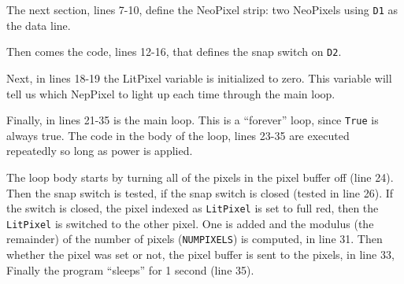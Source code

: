 \documentclass[letterpaper,twoside,12pt]{article}
\begin{document}
The next section, lines 7-10, define the NeoPixel strip: two NeoPixels using 
\texttt{D1} as the data line.

Then comes the code, lines 12-16, that defines the snap switch on \texttt{D2}.

Next, in lines 18-19 the LitPixel variable is initialized to zero. This
variable will tell us which NepPixel to light up each time through the main
loop.

Finally, in lines 21-35 is the main loop. This is a ``forever'' loop, since
\texttt{True} is always true. The code in the body of the loop, lines 23-35
are executed repeatedly so long as power is applied.

The loop body starts by turning all of the pixels in the pixel buffer off
(line 24). Then the snap switch is tested, if the snap switch is closed
(tested in line 26). If the switch is closed, the pixel indexed as
\texttt{LitPixel} is set to full red, then the \texttt{LitPixel} is switched
to the other pixel. One is added and the modulus (the remainder) of the number
of pixels (\texttt{NUMPIXELS}) is computed, in line 31. Then whether the
pixel was set or not, the pixel buffer is sent to the pixels, in line 33, 
Finally the program ``sleeps'' for 1 second (line 35).
\end{document}
